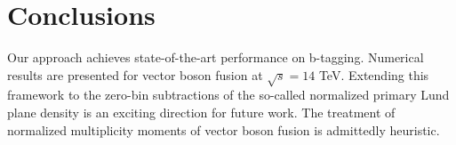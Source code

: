 \section{Conclusions}\label{sec:conclusions}

Our approach achieves state-of-the-art performance on b-tagging.
Numerical results are presented for vector boson fusion at $\sqrt{s} =
14$ TeV. Extending this framework to the zero-bin subtractions of the
so-called normalized primary Lund plane density is an exciting direction
for future work. The treatment of normalized multiplicity moments of
vector boson fusion is admittedly heuristic.

